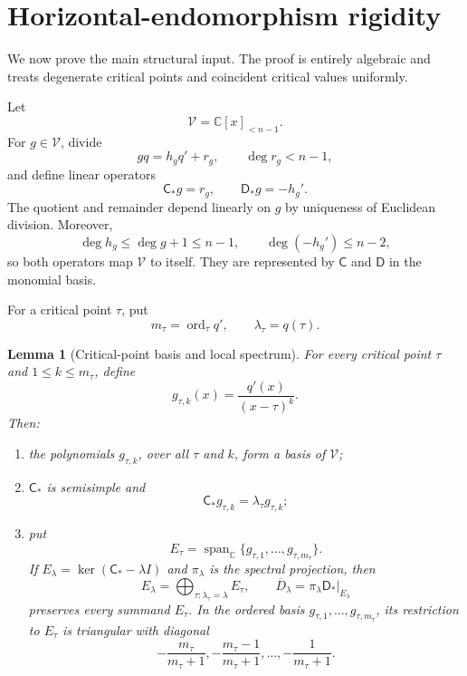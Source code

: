 \documentclass[11pt]{article}
\numberwithin{equation}{section}
\newtheorem{lemma}[lemma]{Lemma}
\theoremstyle{definition}
\theoremstyle{remark}
\newcommand{\C}{\mathbb C}
\newcommand{\Span}{\operatorname{span}}
\newcommand{\ord}{\operatorname{ord}}
\newcommand{\Vcal}{\mathscr V}
\begin{document}
\section{Horizontal-endomorphism rigidity}\label{sec:exp-rigidity}

We now prove the main structural input.  The proof is entirely algebraic and treats degenerate critical points and coincident critical values uniformly.

Let
\[
  \Vcal=\C[x]_{<n-1}.
\]
For $g\in\Vcal$, divide
\begin{equation}\label{eq:g-division}
  gq=h_gq'+r_g,
  \qquad \deg r_g<n-1,
\end{equation}
and define linear operators
\begin{equation}\label{eq:CstarDstar}
  \mathsf C_*g=r_g,
  \qquad
  \mathsf D_*g=-h_g'.
\end{equation}
The quotient and remainder depend linearly on $g$ by uniqueness of Euclidean
division.  Moreover,
\[
  \deg h_g\le\deg g+1\le n-1,
  \qquad
  \deg(-h_g')\le n-2,
\]
so both operators map $\Vcal$ to itself.  They are represented by
$\mathsf C$ and $\mathsf D$ in the monomial basis.

For a critical point $\tau$, put
\[
  m_\tau=\ord_\tau q',
  \qquad
  \lambda_\tau=q(\tau).
\]

\begin{lemma}[Critical-point basis and local spectrum]\label{lem:critical-basis}
For every critical point $\tau$ and $1\le k\le m_\tau$, define
\begin{equation}\label{eq:g-tau-k}
  g_{\tau,k}(x)=\frac{q'(x)}{(x-\tau)^k}.
\end{equation}
Then:
\begin{enumerate}[label=\textup{(\roman*)},leftmargin=2.2em]
\item the polynomials $g_{\tau,k}$, over all $\tau$ and $k$, form a basis of
$\Vcal$;
\item $\mathsf C_*$ is semisimple and
\[
  \mathsf C_*g_{\tau,k}=\lambda_\tau g_{\tau,k};
\]
\item put
\[
  E_\tau=\Span_\C\{g_{\tau,1},\ldots,g_{\tau,m_\tau}\}.
\]
If $E_\lambda=\ker(\mathsf C_*-\lambda I)$ and $\pi_\lambda$ is the spectral
projection, then
\[
  E_\lambda=\bigoplus_{\tau:\lambda_\tau=\lambda}E_\tau,
  \qquad
  \overline D_\lambda=\pi_\lambda\mathsf D_*|_{E_\lambda}
\]
preserves every summand $E_\tau$.  In the ordered basis
$g_{\tau,1},\ldots,g_{\tau,m_\tau}$, its restriction to $E_\tau$ is
triangular with diagonal
\begin{equation}\label{eq:local-D-spectrum}
  -\frac{m_\tau}{m_\tau+1},
  -\frac{m_\tau-1}{m_\tau+1},
  \ldots,
  -\frac1{m_\tau+1}.
\end{equation}
\end{enumerate}
\end{lemma}
\end{document}
